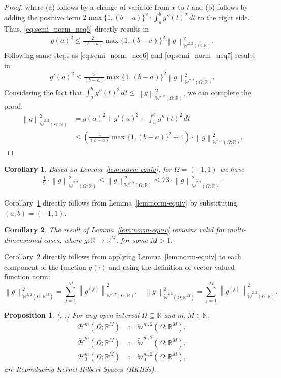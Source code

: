 \documentclass{article}
\newtheorem{proposition}{Proposition}
\newtheorem{corollary}{Corollary}
\newcommand{\norm}[1]{\left\lVert#1\right\rVert}
\newcommand{\sob}[2]{\mathbb{W}^{#1,#2}\left(\Omega; \mathbb{R}\right)}
\newcommand{\sobeq}[2]{\widetilde{\mathbb{W}}^{#1,#2}\left(\Omega; \mathbb{R}\right)}
\newcommand{\sobm}[2]{\mathbb{W}^{#1,#2}\left(\Omega; \mathbb{R}^M\right)}
\newcommand{\sobmz}[2]{\mathbb{W}_0^{#1,#2}\left(\Omega; \mathbb{R}^M\right)}
\newcommand{\sobmeq}[2]{\widetilde{\mathbb{W}}^{#1,#2}\left(\Omega; \mathbb{R}^M\right)}
\newcommand{\hilm}[1]{\mathcal{H}^{#1}\left(\Omega;\mathbb{R}^M\right)}
\newcommand{\hilmz}[1]{\mathcal{H}_0^{#1}\left(\Omega;\mathbb{R}^M\right)}
\newcommand{\hilmtilde}[1]{\widetilde{\mathcal{H}}^{#1}\left(\Omega;\mathbb{R}^M\right)}
\begin{document}
\begin{proof}
    where (a) follows by a change of variable from $x$ to $t$ and (b) follows by adding the positive term $2\max\{1, (b-a)\}^2 \cdot \int_a^b g''(t)^2\,dt$ to the right side. Thus, \eqref{eq:semi_norm_neq6} directly results in
    \begin{align}\label{eq:semi_norm_neq7}
        g(a)^2 \leqslant \frac{2}{(b-a)}\max\{1, (b-a)\}^2 \norm{g}^2_{\sob{2}{2}}.
    \end{align}
    Following same steps as \eqref{eq:semi_norm_neq6} and \eqref{eq:semi_norm_neq7} results in
    \begin{align}
        g'(a)^2 \leqslant \frac{2}{(b-a)}\max\{1, (b-a)\}^2 \norm{g}^2_{\sob{2}{2}}.
    \end{align}
    Considering the fact that $\int_a^b g''(t)^2\,dt \leqslant \norm{g}^2_{\sob{2}{2}}$, we can complete the proof:
    \begin{align}
        \norm{g}^2_{\sobeq{2}{2}} &= g(a)^2 + g'(a)^2 + \int_a^b g''(t)^2\,dt  \nonumber \\ &\leqslant \left(\frac{4}{(b-a)}\max\{1, (b-a)\}^2 + 1\right)\cdot\norm{g}^2_{\sob{2}{2}}.
    \end{align}
\end{proof}
\begin{corollary}\label{cor:norm-equiv-1}
Based on Lemma~\ref{lem:norm-equiv}, for $\Omega=(-1, 1)$ we have 
\begin{align}
     \frac{1}{9}\cdot\norm{g}^2_{\sobeq{2}{2}} \leqslant \norm{g}^2_{\sob{2}{2}} \leqslant 73\cdot\norm{g}^2_{\sobeq{2}{2}}.
\end{align}   
\end{corollary}
Corollary~\ref{cor:norm-equiv-1} directly follows from Lemma~\ref{lem:norm-equiv} by substituting $(a,b)=(-1,1)$.
\begin{corollary}\label{cor:norm-equiv-2}
The result of Lemma~\ref{lem:norm-equiv} remains valid for multi-dimensional cases, where $g:\mathbb{R} \to \mathbb{R}^M$, for some $M>1$.
\end{corollary}
Corollary~\ref{cor:norm-equiv-2} directly follows from applying Lemma~\ref{lem:norm-equiv} to each component of the function $g(\cdot)$ and using the definition of vector-valued function norm:
$$
\norm{g}^2_{\sobm{2}{2}} = \sum^M_{j=1}\norm{g^{(j)}}^2_{\sob{2}{2}}, \quad \norm{g}^2_{\sobmeq{2}{2}} = \sum^M_{j=1}\norm{g^{(j)}}^2_{\sobeq{2}{2}}.
$$
\begin{proposition}\label{prop:sob_hilb} 
(\citep[Section 7.2]{leoni2024first}, \citep[Theorem 121]{berlinet2011reproducing},\citep{wahba1990spline}) For any open interval $\Omega \subseteq \mathbb{R}$ and $m, M \in \mathbb{N}$, 
\begin{align}
    \hilm{m} &:= \sobm{m}{2}, \nonumber \\ \hilmtilde{m} &:= \sobmeq{m}{2},\nonumber \\\hilmz{m} &:= \sobmz{m}{2},
\end{align}
are Reproducing Kernel Hilbert Spaces (RKHSs).
\end{proposition}
\end{document}
